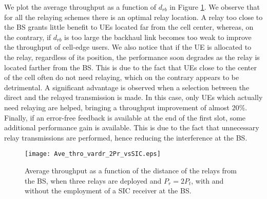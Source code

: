 \documentclass[12pt, letterpaper, onecolumn, draftcls]{IEEEtran}
\newcommand{\figw}{0.55\columnwidth}
\begin{document}
We plot the average throughput as a function of $d_{rb}$ in Figure \ref{fig:Ave_thro_vardr_2Pr_vsSIC}. We observe that for all the relaying schemes there is an optimal relay location. A relay too close to the BS grants little benefit to UEs located far from the cell center, whereas, on the contrary, if $d_{rb}$ is too large the backhaul link becomes too weak to improve the throughput of cell-edge users.
We also notice that if the UE is allocated to the relay, regardless of its position, the performance soon degrades as the relay is located farther from the BS. This is due to the fact that UEs close to the center of the cell often do not need relaying, which on the contrary appears to be detrimental. A significant advantage is observed when a selection between the direct and the relayed transmission is made.
In this case, only UEs which actually need relaying are helped, bringing a throughput improvement of almost 20\%. Finally, if an error-free feedback is available at the end of the first slot, some additional performance gain is available. This is due to the fact that unnecessary relay transmissions are performed, hence reducing the interference at the BS. 
\begin{figure}
    \centering
    \texttt{[image: Ave\_thro\_vardr\_2Pr\_vsSIC.eps]}
     \caption{\small Average throughput as a function of the distance of the relays from the BS, when three relays are deployed and $P_r = 2P_t$, with and without the employment of a SIC receiver at the BS.}
     \vspace{-1cm}
  \label{fig:Ave_thro_vardr_2Pr_vsSIC}
\end{figure}
\end{document}
